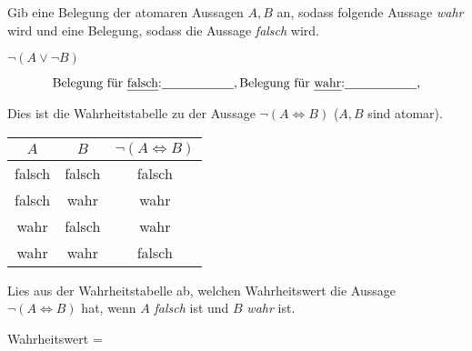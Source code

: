 \documentclass{uebungsblatt}
\begin{document}
\begin{exercise}
    Gib eine Belegung der atomaren Aussagen $A,B$ an, sodass folgende Aussage \emph{wahr} wird
    und eine Belegung, sodass die Aussage \emph{falsch} wird.

    \begin{center}
     $\lnot (A \lor \lnot B)$
    \end{center}
    \[
        \textrm{Belegung für \emph{falsch}:}\answerfield{2cm}{9},
        \textrm{Belegung für \emph{wahr}:}\answerfield{2cm}{12},
    \]
\end{exercise}


\begin{exercise}

    Dies ist die Wahrheitstabelle zu der Aussage $\lnot (A \iff B)$ ($A,B$ sind atomar).

    \begin{center}
        \begin{tabular}{cc c}\toprule
            $A$ & $B$ & $\lnot (A \iff B)$\\\midrule
            falsch & falsch & falsch\\
            falsch & wahr & wahr \\
            wahr & falsch & wahr\\
            wahr & wahr & falsch \\\bottomrule
        \end{tabular}
    \end{center}

    Lies aus der Wahrheitstabelle ab, welchen Wahrheitswert 
    die Aussage $\lnot (A \iff B)$ hat, wenn $A$ \emph{falsch} ist und $B$ \emph{wahr}
    ist.
    \begin{center}
    Wahrheitswert = 
    \end{center}

\end{exercise}
\end{document}
